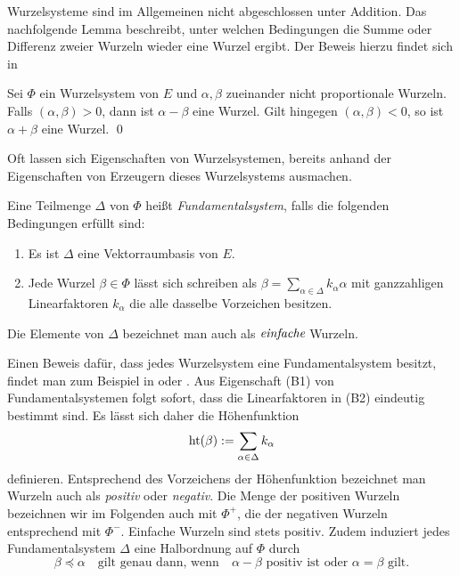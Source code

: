 Wurzelsysteme sind im Allgemeinen nicht abgeschlossen unter Addition. 
Das nachfolgende Lemma beschreibt, unter welchen Bedingungen die Summe oder Differenz zweier Wurzeln wieder eine Wurzel ergibt. Der Beweis hierzu findet sich in \cite[S.45]{humphreys1972introduction}

\begin{lem}
  \label{lem:sumDiffRoot}
  Sei $\Phi$ ein Wurzelsystem von $E$ und $\alpha, \beta$ zueinander nicht proportionale Wurzeln.
  Falls $(\alpha, \beta) > 0$, dann ist $\alpha - \beta$ eine Wurzel.
  Gilt hingegen $(\alpha, \beta) < 0$, so ist $\alpha + \beta$ eine Wurzel. \qed
\end{lem}

Oft lassen sich Eigenschaften von Wurzelsystemen, bereits anhand der Eigenschaften von Erzeugern dieses Wurzelsystems ausmachen.

\begin{defn}
  Eine Teilmenge $\Delta$ von $\Phi$ heißt \emph{Fundamentalsystem}, falls die folgenden Bedingungen erfüllt sind:
  \begin{enumerate}[(B1)]
    \item Es ist $\Delta$ eine Vektorraumbasis von $E$.
    \item Jede Wurzel $\beta \in \Phi$ lässt sich schreiben als $\beta = \sum_{\alpha \in \Delta} k_\alpha \alpha$ mit ganzzahligen Linearfaktoren $k_\alpha$ die alle dasselbe Vorzeichen besitzen.
  \end{enumerate}
  Die Elemente von $\Delta$ bezeichnet man auch als $\emph{einfache}$ Wurzeln.
\end{defn}

\begin{bem}
  Einen Beweis dafür, dass jedes Wurzelsystem eine Fundamentalsystem besitzt, findet man zum Beispiel in \cite[S.48]{humphreys1972introduction} oder \cite[S.116]{erdmann2006introduction}.
  Aus Eigenschaft (B1) von Fundamentalsystemen folgt sofort, dass die Linearfaktoren in (B2) eindeutig bestimmt sind. 
  Es lässt sich daher die Höhenfunktion 
  \begin{displaymath}
    \operatorname{ht}(\beta) := \sum_{\alpha \in \Delta} k_\alpha 
  \end{displaymath}
  definieren.
  Entsprechend des Vorzeichens der Höhenfunktion bezeichnet man Wurzeln auch als \emph{positiv} oder \emph{negativ}.
  Die Menge der positiven Wurzeln bezeichnen wir im Folgenden auch mit $\Phi^+$, die der negativen Wurzeln entsprechend mit $\Phi^-$.
  Einfache Wurzeln sind stets positiv.
  Zudem induziert jedes Fundamentalsystem $\Delta$ eine Halbordnung auf $\Phi$ durch
  \begin{displaymath}
    \beta \preceq \alpha \quad \text{gilt genau dann, wenn} \quad \alpha - \beta \text{ positiv ist oder } \alpha = \beta \text{ gilt}.
  \end{displaymath}
\end{bem}

